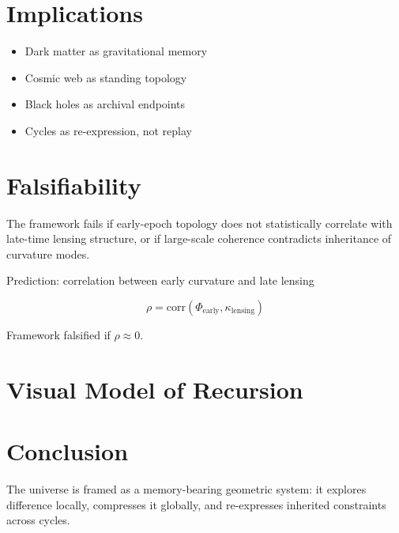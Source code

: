 \documentclass[12pt]{article}
\begin{document}
\section{Implications}

\begin{itemize}
\item Dark matter as gravitational memory
\item Cosmic web as standing topology
\item Black holes as archival endpoints
\item Cycles as re-expression, not replay
\end{itemize}

\section{Falsifiability}

The framework fails if early-epoch topology does not statistically correlate with late-time lensing structure, or if large-scale coherence contradicts inheritance of curvature modes.

Prediction: correlation between early curvature and late lensing

\[
\rho = \text{corr}(\Phi_{\text{early}}, \kappa_{\text{lensing}})
\]

Framework falsified if $\rho \approx 0$.

\section{Visual Model of Recursion}

\begin{center}
\end{center}

\section{Conclusion}

The universe is framed as a memory-bearing geometric system: it explores difference locally, compresses it globally, and re-expresses inherited constraints across cycles.
\end{document}
